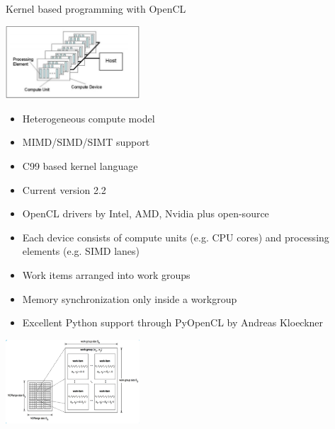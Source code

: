 \documentclass[dvipsnames,10pt]{beamer}
\begin{document}
\begin{frame}{Kernel based programming with OpenCL}
\begin{minipage}{5cm}
\begin{center}
    \includegraphics[width=5cm]{../figs/opencl_overview.png}
\end{center}
\end{minipage}
\begin{minipage}{5cm}
\begin{small}
\begin{itemize}
\item Heterogeneous compute model
\item MIMD/SIMD/SIMT support
\item C99 based kernel language
\item Current version 2.2
\item OpenCL drivers by Intel, AMD, Nvidia plus open-source
\end{itemize}
\end{small}
\end{minipage}
\begin{minipage}{5cm}
\begin{small}
\begin{itemize}
\item Each device consists of compute units (e.g. CPU cores) and processing elements (e.g. SIMD lanes)
\item Work items arranged into work groups
\item Memory synchronization only inside a workgroup
\item Excellent Python support through PyOpenCL by Andreas Kloeckner
\end{itemize}
\end{small}
\end{minipage}
\begin{minipage}{5cm}
\begin{center}
    \includegraphics[width=5cm]{../figs/cl_workgroups.png}
\end{center}
\end{minipage}

\end{frame}
\end{document}
